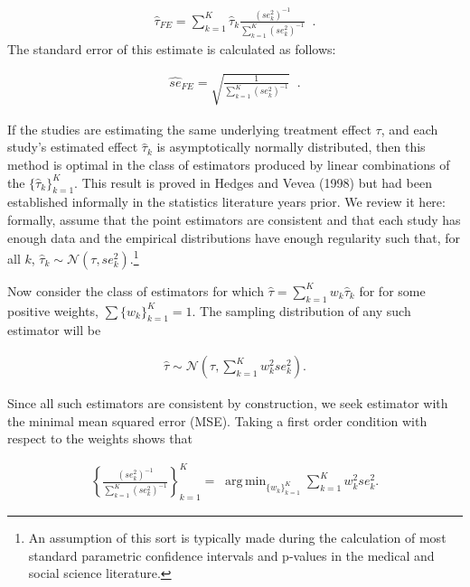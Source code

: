 \documentclass[12pt]{article}
\DeclareMathOperator*{\argmin}{arg\,min}
\begin{document}
\begin{equation}
\label{fe_tau}
\begin{aligned}
\hat{\tau}_{FE} = \sum_{k=1}^K \hat{\tau}_k \frac{  (se^2_k)^{-1}   }{  \sum_{k=1}^K  (se^2_k)^{-1}  } \; \; .
\end{aligned}
\end{equation}
The standard error of this estimate is calculated as follows:

\begin{equation}
\label{fe_se}
\begin{aligned}
\hat{se}_{FE} = \sqrt{ \frac{ 1  }{  \sum_{k=1}^K  (se^2_k)^{-1}  }} \; \; .
\end{aligned}
\end{equation}

If the studies are estimating the same underlying treatment effect $\tau$, and each study's estimated effect $\hat{\tau}_k$ is asymptotically  normally distributed, then this method is optimal in the class of estimators produced by linear combinations of the $\{\hat{\tau}_k\}_{k=1}^K$. This result is proved in Hedges and Vevea (1998) but had been established informally in the statistics literature years prior. We review it here: formally, assume that the point estimators are consistent and that each study has enough data and the empirical distributions have enough regularity such that, for all $k$, $\hat{\tau}_k \sim \mathcal{N}(\tau, se^2_{k})$.\footnote{An assumption of this sort is typically made during the calculation of most standard parametric confidence intervals and p-values in the medical and social science literature.}

Now consider the class of estimators for which $\hat{\tau} = \sum_{k=1}^{K} w_k \hat{\tau}_k$ for 
for some positive weights, $\sum \{w_k\}_{k=1}^K =1$.
The sampling distribution of any such estimator will be

\begin{equation}
\begin{aligned}
\hat{\tau} \sim \mathcal{N}(\tau, \sum_{k=1}^{K} w_k^2 se^2_{k}) .
\end{aligned}
\end{equation}

Since all such estimators are consistent by construction, we seek estimator with the minimal mean squared error (MSE). Taking a first order condition with respect to the weights shows that

\begin{equation}\label{fe}
\begin{aligned}
\left\{ \frac{(se^2_k)^{-1}}{\sum_{k=1}^K(se^2_k)^{-1}} \right\}_{k=1}^K = \; \argmin_{ \{w_k\}_{k=1}^K  } \sum_{k=1}^{K} w_k^2 se^2_{k}.
\end{aligned}
\end{equation}
\end{document}
